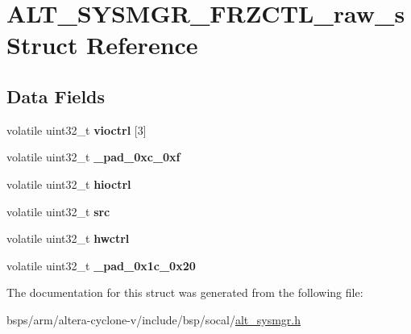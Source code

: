 \hypertarget{structALT__SYSMGR__FRZCTL__raw__s}{}\section{A\+L\+T\+\_\+\+S\+Y\+S\+M\+G\+R\+\_\+\+F\+R\+Z\+C\+T\+L\+\_\+raw\+\_\+s Struct Reference}
\label{structALT__SYSMGR__FRZCTL__raw__s}
\subsection*{Data Fields}
\begin{DoxyCompactItemize}
\item 
\mbox{\label{structALT__SYSMGR__FRZCTL__raw__s_aa0e395e7f840233e4f804c8324e04c89}} 
volatile uint32\+\_\+t {\bfseries vioctrl} \mbox{[}3\mbox{]}
\item 
\mbox{\label{structALT__SYSMGR__FRZCTL__raw__s_a6a54377eeca25f7ad4358bccbd267e32}} 
volatile uint32\+\_\+t {\bfseries \+\_\+pad\+\_\+0xc\+\_\+0xf}
\item 
\mbox{\label{structALT__SYSMGR__FRZCTL__raw__s_a0b6ec16cc58987fd4b232c2cf60cfdbd}} 
volatile uint32\+\_\+t {\bfseries hioctrl}
\item 
\mbox{\label{structALT__SYSMGR__FRZCTL__raw__s_adb93de2b573cf41d6ff438ecf3aec080}} 
volatile uint32\+\_\+t {\bfseries src}
\item 
\mbox{\label{structALT__SYSMGR__FRZCTL__raw__s_a35ed5a4082c9e156b42a1d585d0c5e18}} 
volatile uint32\+\_\+t {\bfseries hwctrl}
\item 
\mbox{\label{structALT__SYSMGR__FRZCTL__raw__s_ab03289bffa89180f7885871517386b47}} 
volatile uint32\+\_\+t {\bfseries \+\_\+pad\+\_\+0x1c\+\_\+0x20}
\end{DoxyCompactItemize}


The documentation for this struct was generated from the following file\+:\begin{DoxyCompactItemize}
\item 
bsps/arm/altera-\/cyclone-\/v/include/bsp/socal/\mbox{\hyperlink{alt__sysmgr_8h}{alt\+\_\+sysmgr.\+h}}\end{DoxyCompactItemize}

